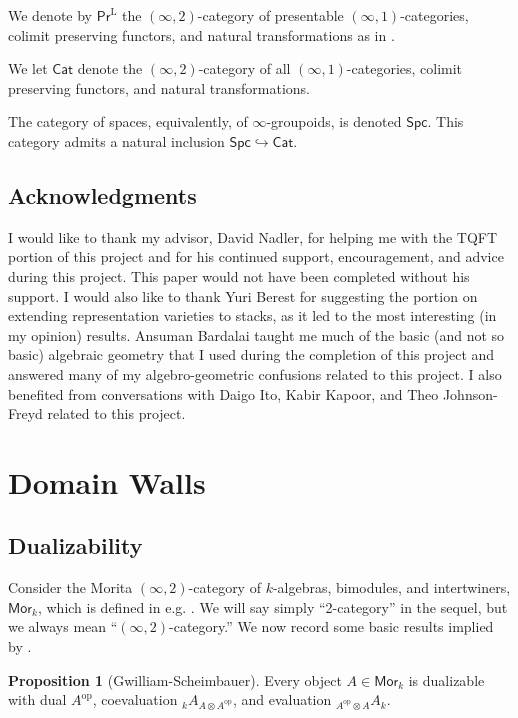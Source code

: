 \documentclass{article}
\numberwithin{equation}{section}
\theoremstyle{quest}
\theoremstyle{definition}
\newtheorem{prop}[thm]{Proposition}
\theoremstyle{remark}
\begin{document}
We denote by $\mathsf{Pr}^\text{L}$ the $(\infty,2)$-category of presentable $(\infty,1)$-categories, colimit preserving functors, and natural transformations as in \cite{HA}.

We let $\mathsf{Cat}$ denote the $(\infty,2)$-category of all $(\infty,1)$-categories, colimit preserving functors, and natural transformations.

The category of spaces, equivalently, of  $\infty$-groupoids, is denoted $\mathsf{Spc}$. This category admits a natural inclusion $\mathsf{Spc}\hookrightarrow \mathsf{Cat}$.
\subsection{Acknowledgments}
I would like to thank my advisor, David Nadler, for helping me with the TQFT portion of this project and for his continued support, encouragement, and advice during this project. This paper would not have been completed without his support. I would also like to thank Yuri Berest for suggesting the portion on extending representation varieties to stacks, as it led to the most interesting (in my opinion) results. Ansuman Bardalai taught me much of the basic (and not so basic) algebraic geometry that I used during the completion of this project and answered many of my algebro-geometric confusions related to this project. I also benefited from conversations with Daigo Ito, Kabir Kapoor, and Theo Johnson-Freyd related to this project.

\section{Domain Walls}\label{sec:domain-walls}
\subsection{Dualizability}
Consider the Morita $(\infty,2)$-category of $k$-algebras, bimodules, and intertwiners, $\mathsf{Mor}_k$, which is defined in e.g. \cite{haugseng-definition-of-morita-bicat}. We will say simply ``2-category'' in the sequel, but we always mean ``$(\infty,2)$-category.'' We now record some basic results implied by \cite[Theorem 5.1]{GS}.
\begin{prop}[Gwilliam-Scheimbauer]
	Every object $A\in\mathsf{Mor}_k$ is dualizable with dual $A^{\text{op}}$, coevaluation ${}_kA_{A\otimes A^{\text{op}}}$, and evaluation ${}_{A^{\text{op}}\otimes A}A_k$.
\end{prop}
\end{document}
